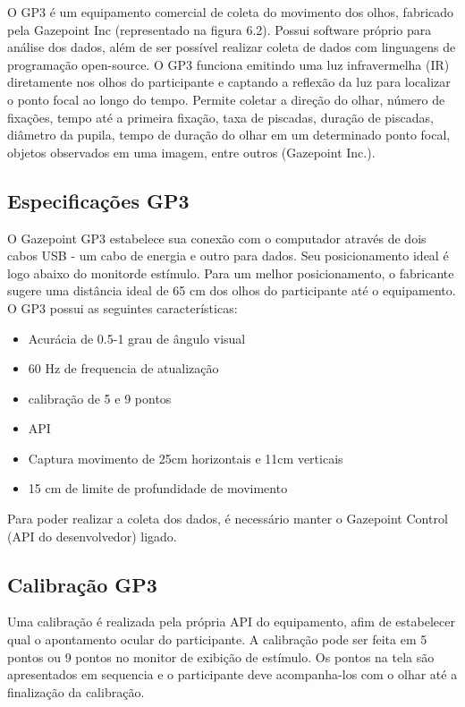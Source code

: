 O GP3 é um equipamento comercial de coleta do movimento dos olhos, 
fabricado pela Gazepoint Inc (representado na figura 6.2). Possui software próprio para análise dos dados, 
além de ser possível realizar coleta de dados com linguagens de programação open-source. O GP3 funciona emitindo uma luz infravermelha (IR) 
diretamente nos olhos do participante e captando a reflexão da luz para localizar o ponto focal ao longo do tempo. 
Permite coletar a direção do olhar, número de fixações, tempo até a primeira fixação, taxa de piscadas,
 duração de piscadas, diâmetro da pupila, tempo de duração do olhar em um determinado ponto focal, 
 objetos observados em uma imagem, entre outros (Gazepoint Inc.).


\subsection{Especificações GP3}

O Gazepoint GP3 estabelece sua conexão com o computador através de dois cabos USB - um cabo de energia e outro para dados.
Seu posicionamento ideal é logo abaixo do monitorde estímulo. Para um melhor posicionamento, o fabricante 
sugere uma distância ideal de 65 cm dos olhos do participante até o equipamento. O GP3 possui as seguintes características:

\begin{itemize}
    \item Acurácia de 0.5-1 grau de ângulo visual
    \item 60 Hz de frequencia de atualização
    \item calibração de 5 e 9 pontos
    \item API
    \item Captura movimento de 25cm horizontais e 11cm verticais
    \item 15 cm de limite de profundidade de movimento
\end{itemize}

Para poder realizar a coleta dos dados, é necessário manter o Gazepoint Control (API do desenvolvedor) ligado. 

\subsection{Calibração GP3}
Uma calibração é realizada pela própria API do equipamento, afim de estabelecer qual o apontamento ocular do participante. 
A calibração pode ser feita em 5 pontos ou 9 pontos no monitor de exibição de estímulo. Os pontos na tela são apresentados
em sequencia e o participante deve acompanha-los com o olhar até a finalização da calibração. 

